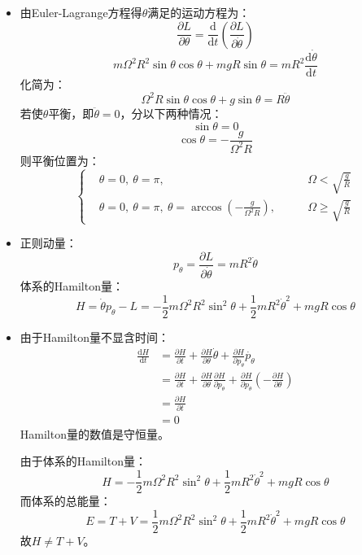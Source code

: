 \documentclass[a4paper,fontset=windows]{ctexart}
\begin{document}
\begin{itemize}
        \item[9.(b)]
        由Euler-Lagrange方程得$\theta$满足的运动方程为：
        \[
        \frac{\partial L}{\partial\theta} = \frac{\mathrm{d}}{\mathrm{d}t}\left(\frac{\partial L}{\partial\dot{\theta}}\right)
        \]
        \[
        m\varOmega^2 R^2\sin\theta\cos\theta + mgR\sin\theta = mR^2\frac{\mathrm{d}\dot{\theta}}{\mathrm{d}t}
        \]
        化简为：
        \[
        \varOmega^2 R\sin\theta\cos\theta + g\sin\theta = R\ddot{\theta}
        \]
        若使$\theta$平衡，即$\ddot{\theta} = 0$，分以下两种情况：
        \[
        \sin\theta = 0
        \]
        \[
        \cos\theta = -\frac{g}{\varOmega^2 R}
        \]
        则平衡位置为：
        \[
        \left\{
        \begin{aligned}
        & \theta = 0,\ \theta = \pi,\qquad & \varOmega < \sqrt{\frac{g}{R}} \\
        & \theta = 0,\ \theta = \pi,\ \theta = \arccos\left({-\frac{g}{\varOmega^2 R}}\right),\qquad & \varOmega \geqslant \sqrt{\frac{g}{R}}
        \end{aligned}
        \right.
        \]
        \medskip

        \item[9.(c)]
        正则动量：
        \[
        p_\theta = \frac{\partial L}{\partial\dot{\theta}} = mR^2\dot{\theta}
        \]
        体系的Hamilton量：
        \[
        H = \dot{\theta}p_\theta - L = -\frac{1}{2}m\varOmega^2 R^2\sin^2\theta + \frac{1}{2}mR^2\dot{\theta}^2 + mgR\cos\theta
        \]
        \medskip

        \item[9.(d)]
        由于Hamilton量不显含时间：
        \begin{align*}
        \frac{\mathrm{d}H}{\mathrm{d}t}
        &= \frac{\partial H}{\partial t} + \frac{\partial H}{\partial \theta}\dot{\theta} + \frac{\partial H}{\partial p_\theta}\dot{p_\theta} \\
        &= \frac{\partial H}{\partial t} + \frac{\partial H}{\partial\theta}\frac{\partial H}{\partial p_\theta} + \frac{\partial H}{\partial p_\theta}\left(-\frac{\partial H}{\partial\theta}\right) \\
        &= \frac{\partial H}{\partial t} \\
        &= 0
        \end{align*}
        Hamilton量的数值是守恒量。

        由于体系的Hamilton量：
        \[
        H = -\frac{1}{2}m\varOmega^2 R^2\sin^2\theta + \frac{1}{2}mR^2\dot{\theta}^2 + mgR\cos\theta
        \]
        而体系的总能量：
        \[
        E = T + V = \frac{1}{2}m\varOmega^2 R^2\sin^2\theta + \frac{1}{2}mR^2\dot{\theta}^2 + mgR\cos\theta
        \]
        故$H \neq T + V$。
        \bigskip

    \end{itemize}
\end{document}
